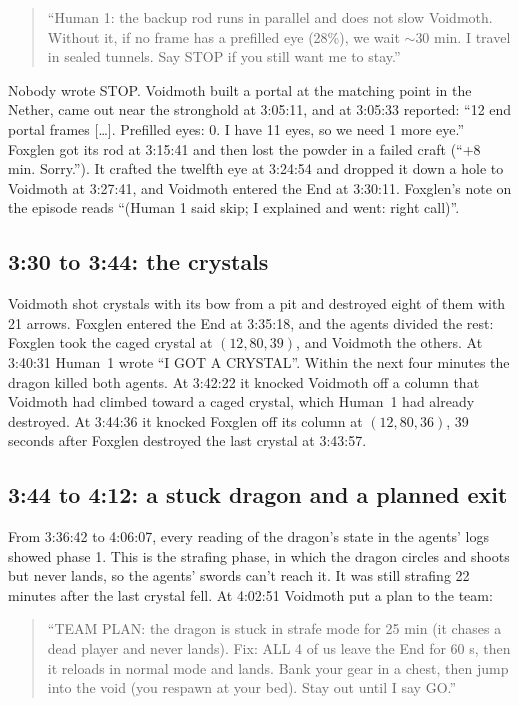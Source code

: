 \documentclass[11pt,a4paper]{article}
\begin{document}
\begin{quote}
``Human 1: the backup rod runs in parallel and does not slow Voidmoth. Without it, if no frame has a prefilled eye (28\%), we wait ${\sim}$30 min. I travel in sealed tunnels. Say STOP if you still want me to stay.''
\end{quote}

\noindent Nobody wrote STOP. Voidmoth built a portal at the matching point in the Nether, came out near the stronghold at 3:05:11, and at 3:05:33 reported: ``12 end portal frames [\ldots]. Prefilled eyes: 0. I have 11 eyes, so we need 1 more eye.'' Foxglen got its rod at 3:15:41 and then lost the powder in a failed craft (``+8 min. Sorry.''). It crafted the twelfth eye at 3:24:54 and dropped it down a hole to Voidmoth at 3:27:41, and Voidmoth entered the End at 3:30:11. Foxglen's note on the episode reads ``(Human 1 said skip; I explained and went: right call)''.

\subsection{3:30 to 3:44: the crystals}

Voidmoth shot crystals with its bow from a pit and destroyed eight of them with 21 arrows. Foxglen entered the End at 3:35:18, and the agents divided the rest: Foxglen took the caged crystal at $(12, 80, 39)$, and Voidmoth the others. At 3:40:31 Human~1 wrote ``I GOT A CRYSTAL''. Within the next four minutes the dragon killed both agents. At 3:42:22 it knocked Voidmoth off a column that Voidmoth had climbed toward a caged crystal, which Human~1 had already destroyed. At 3:44:36 it knocked Foxglen off its column at $(12, 80, 36)$, 39 seconds after Foxglen destroyed the last crystal at 3:43:57.

\subsection{3:44 to 4:12: a stuck dragon and a planned exit}

From 3:36:42 to 4:06:07, every reading of the dragon's state in the agents' logs showed phase 1. This is the strafing phase, in which the dragon circles and shoots but never lands, so the agents' swords can't reach it. It was still strafing 22 minutes after the last crystal fell. At 4:02:51 Voidmoth put a plan to the team:

\begin{quote}
``TEAM PLAN: the dragon is stuck in strafe mode for 25 min (it chases a dead player and never lands). Fix: ALL 4 of us leave the End for 60 s, then it reloads in normal mode and lands. Bank your gear in a chest, then jump into the void (you respawn at your bed). Stay out until I say GO.''
\end{quote}
\end{document}
